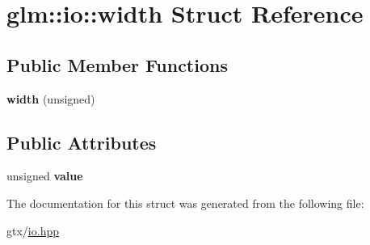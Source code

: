 \hypertarget{structglm_1_1io_1_1width}{\section{glm\-:\-:io\-:\-:width Struct Reference}
\label{structglm_1_1io_1_1width}
}
\subsection*{Public Member Functions}
\begin{DoxyCompactItemize}
\item 
\hypertarget{structglm_1_1io_1_1width_a204a0d27a408c9f33b23438481eaa4be}{{\bfseries width} (unsigned)}\label{structglm_1_1io_1_1width_a204a0d27a408c9f33b23438481eaa4be}

\end{DoxyCompactItemize}
\subsection*{Public Attributes}
\begin{DoxyCompactItemize}
\item 
\hypertarget{structglm_1_1io_1_1width_a6bf1338eb947811d36ec93bd2e9b8425}{unsigned {\bfseries value}}\label{structglm_1_1io_1_1width_a6bf1338eb947811d36ec93bd2e9b8425}

\end{DoxyCompactItemize}


The documentation for this struct was generated from the following file\-:\begin{DoxyCompactItemize}
\item 
gtx/\hyperlink{io_8hpp}{io.\-hpp}\end{DoxyCompactItemize}
